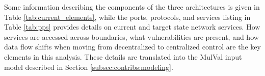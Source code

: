Some information describing the components of the three architectures is given in Table \ref{tab:current_elements}, while the ports, protocols, and services listing in Table \ref{tab:pps} provides details on current and target state network services. How services are accessed across boundaries, what vulnerabilities are present, and how data flow shifts when moving from decentralized to centralized control are the key elements in this analysis. These details are translated into the MulVal input model described in Section \ref{subsec:contribs:modeling}. %

